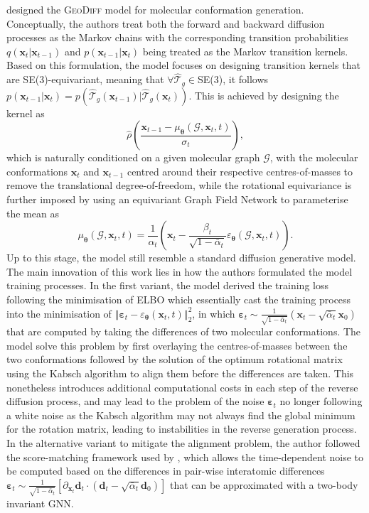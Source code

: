 \citet{xu2022geodiff} designed the \textsc{GeoDiff} model for molecular conformation generation. Conceptually, the authors treat both the forward and backward diffusion processes as the Markov chains with the corresponding transition probabilities $q(\bm{x}_{t}|\bm{x}_{t-1})$ and $p(\bm{x}_{t-1}|\bm{x}_t)$ being treated as the Markov transition kernels. Based on this formulation, the model focuses on designing transition kernels that are SE(3)-equivariant, meaning that  $\forall\hat{\mathcal{T}}_g\in$SE(3), it follows $p(\bm{x}_{t-1}|\bm{x}_t)=p\left(\hat{\mathcal{T}}_g\left(\bm{x}_{t-1}\right)|\hat{\mathcal{T}}_g\left(\bm{x}_t\right)\right)$. This is achieved by designing the kernel as 
\begin{equation*}
    \hat{\rho}\left(\frac{\bm{x}_{t-1}-\mu_{\boldsymbol{\theta}}(\mathcal{G},\bm{x}_t,t)}{\sigma_t}\right),
\end{equation*}
which is naturally conditioned on a given molecular graph $\mathcal{G}$, with the molecular conformations $\bm{x}_{t}$ and $\bm{x}_{t-1}$ centred around their respective centres-of-masses to remove the translational degree-of-freedom, while the rotational equivariance is further imposed by using an equivariant Graph Field Network\cite{satorras2021n} to parameterise the mean as 
\begin{equation*}
    \mu_{\boldsymbol{\theta}}(\mathcal{G},\bm{x}_t,t)=\frac{1}{\alpha_t}\left(\bm{x}_t -\frac{\beta_t}{\sqrt{1-\bar{\alpha}_t}}\varepsilon_{\boldsymbol{\theta}}(\mathcal{G},\bm{x}_t,t) \right).
\end{equation*}
Up to this stage, the model still resemble a standard diffusion generative model. The main innovation of this work lies in how the authors formulated the model training processes. In the first variant, the model derived the training loss following the minimisation of ELBO which essentially cast the training process into the minimisation of $\left\Vert \boldsymbol{\varepsilon}_t -\varepsilon_{\boldsymbol{\theta}}(\bm{x}_t,t) \right\Vert_2^2$, in which $\boldsymbol{\varepsilon}_t\sim \frac{1}{\sqrt{1-\bar{\alpha}_t}}\left(\bm{x}_t-\sqrt{\bar{\alpha}_t}\bm{x}_0\right)$ that are computed by taking the differences of two molecular conformations. The model solve this problem by first overlaying the centres-of-masses between the two conformations followed by the solution of the optimum rotational matrix using the Kabsch algorithm to align them before the differences are taken. This nonetheless introduces additional computational costs in each step of the reverse diffusion process, and may lead to the problem of the noise $\boldsymbol{\varepsilon}_t$ no longer following a white noise as the Kabsch algorithm may not always find the global minimum for the rotation matrix, leading to instabilities in the reverse generation process.  In the alternative variant to mitigate the alignment problem, the author followed the score-matching framework used by \citet{shi2021learning}, which allows the time-dependent noise to be computed based on the differences in pair-wise interatomic differences $\boldsymbol{\varepsilon}_t\sim\frac{1}{\sqrt{1-\bar{\alpha}_t}}[\partial_{\bm{x}_t}\bm{d}_t\cdot\left( \bm{d}_t-\sqrt{\bar{\alpha}_t}\bm{d}_0 \right)]$ that can be approximated with a two-body invariant GNN.
